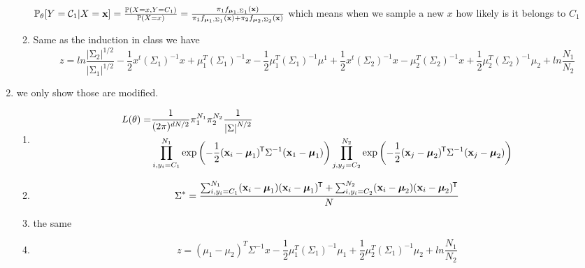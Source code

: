 \documentclass{article}
\newcommand*{\tran}{^{\mkern-1.5mu\mathsf{T}}}
\def\vecx{{\mathbf x}}
\def\vecmu{{\boldsymbol \mu}}
\def\matSigma{{\mathbf{\mathrm{\Sigma}}}}
\def\prob{\mathbb{P}}
\def\calC{{\cal C}}
\begin{document}
\begin{enumerate}[label=(\alph*)]
\begin{enumerate}[label=(\roman*)]
        $\prob_\theta[Y=\calC_1|X=\vecx] = \frac{\prob(X=x,Y=C_1)}{\prob(X=x)} = \frac{\pi_1f_{\vecmu_1,\matSigma_1}(\vecx)}{\pi_1f_{\vecmu_1,\matSigma_1}(\vecx)+\pi_2f_{\vecmu_2,\matSigma_2}(\vecx)}$ which means when we sample a new $x$ how likely is it belongs to $C_1$
        \item Same as the induction in class we have
        \[
        z = ln\frac{\left| \matSigma_2 \right|^{1/2}}{\left| \matSigma_1 \right|^{1/2}} - \frac{1}{2}x^t(\Sigma_1)^{-1}x + \mu_1^T(\Sigma_1)^{-1}x-\frac{1}{2}\mu_1^T(\Sigma_1)^{-1}\mu^1+\frac{1}{2}x^t(\Sigma_2)^{-1}x-\mu_2^T(\Sigma_2)^{-1}x+\frac{1}{2}\mu_2^T(\Sigma_2)^{-1}\mu_2+ln\frac{N_1}{N_2}
        \]
    \end{enumerate}
    \item we only show those are modified.
    \begin{enumerate}[label=(\roman*)]
        \item 
        \begin{align*}
        L(\theta) = &\frac{1}{(2\pi)^{dN/2}}\pi_1^{N_1}\pi_2^{N_2}\frac{1}{\left| \matSigma \right|^{N/2}}\\
        &\prod_{i,y_i=C_1}^{N_1}\exp\left(-\frac{1}{2}(\vecx_i-\vecmu_1)\tran \matSigma^{-1}(\vecx_1-\vecmu_1)\right) \prod_{j,y_j=C_2}^{N_2}\exp\left(-\frac{1}{2}(\vecx_j-\vecmu_2)\tran \matSigma^{-1}(\vecx_j-\vecmu_2)\right)
        \end{align*}
        \item 
        \[
        \Sigma^* = \frac{\sum_{i,y_i=C_1}^{N_1}(\vecx_i-\vecmu_1)(\vecx_i-\vecmu_1)\tran+\sum_{i,y_i=C_2}^{N_2}(\vecx_i-\vecmu_2)(\vecx_i-\vecmu_2)\tran}{N}
        \]
        \item the same
        \item 
        \[
        z = (\mu_1-\mu_2)^T\Sigma^{-1}x- \frac{1}{2}\mu_1^T(\Sigma_1)^{-1}\mu_1+ \frac{1}{2}\mu_2^T(\Sigma_1)^{-1}\mu_2 + ln\frac{N_1}{N_2}
        \]
    \end{enumerate}
\end{enumerate}
\end{document}
